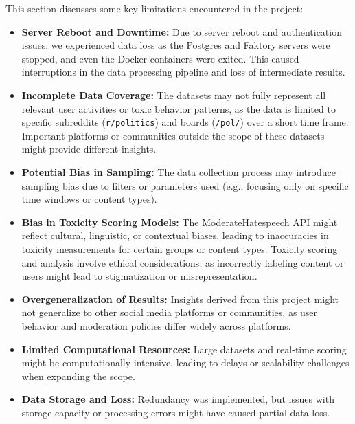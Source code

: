 \documentclass[sigconf]{acmart}
\begin{document}
This section discusses some key limitations encountered in the project:

\begin{itemize}

    \item \textbf{Server Reboot and Downtime:} Due to server reboot and authentication issues, we experienced data loss as the Postgres and Faktory servers were stopped, and even the Docker containers were exited. This caused interruptions in the data processing pipeline and loss of intermediate results.

    \item \textbf{Incomplete Data Coverage:} The datasets may not fully represent all relevant user activities or toxic behavior patterns, as the data is limited to specific subreddits (\texttt{r/politics}) and boards (\texttt{/pol/}) over a short time frame. Important platforms or communities outside the scope of these datasets might provide different insights.
    
    \item \textbf{Potential Bias in Sampling:} The data collection process may introduce sampling bias due to filters or parameters used (e.g., focusing only on specific time windows or content types).

    \item \textbf{Bias in Toxicity Scoring Models:} The ModerateHatespeech API might reflect cultural, linguistic, or contextual biases, leading to inaccuracies in toxicity measurements for certain groups or content types. Toxicity scoring and analysis involve ethical considerations, as incorrectly labeling content or users might lead to stigmatization or misrepresentation.
    
    \item \textbf{Overgeneralization of Results:} Insights derived from this project might not generalize to other social media platforms or communities, as user behavior and moderation policies differ widely across platforms.

    \item \textbf{Limited Computational Resources:} Large datasets and real-time scoring might be computationally intensive, leading to delays or scalability challenges when expanding the scope.
    
    \item \textbf{Data Storage and Loss:} Redundancy was implemented, but issues with storage capacity or processing errors might have caused partial data loss.

    
\end{itemize}
\end{document}
